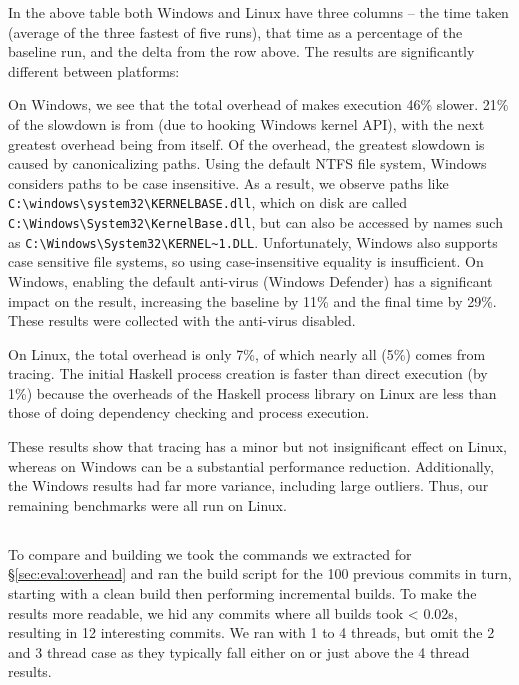 In the above table both Windows and Linux have three columns -- the time taken (average of the three fastest of five runs), that time as a percentage of the baseline \Make run, and the delta from the row above. The results are significantly different between platforms:

On Windows, we see that the total overhead of \Rattle makes execution 46\% slower. 21\% of the slowdown is from \Fsatrace (due to hooking Windows kernel API), with the next greatest overhead being from \Rattle itself. Of the \Rattle overhead, the greatest slowdown is caused by canonicalizing paths. Using the default NTFS file system, Windows considers paths to be case insensitive. As a result, we observe paths like \verb"C:\windows\system32\KERNELBASE.dll", which on disk are called \verb"C:\Windows\System32\KernelBase.dll", but can also be accessed by names such as \verb"C:\Windows\System32\KERNEL~1.DLL". Unfortunately, Windows also supports case sensitive file systems, so  using case-insensitive equality is insufficient.
%
On Windows, enabling the default anti-virus (Windows Defender) has a significant impact on the result, increasing the \Make baseline by 11\% and the final time by 29\%. These results were collected with the anti-virus disabled.

On Linux, the total overhead is only 7\%, of which nearly all (5\%) comes from tracing. The initial Haskell process creation is faster than direct \Make execution (by 1\%) because the overheads of the Haskell process library on Linux are less than those of \Make doing dependency checking and process execution.


These results show that tracing has a minor but not insignificant effect on Linux, whereas on Windows can be a substantial performance reduction. Additionally, the Windows results had far more variance, including large outliers. Thus, our remaining benchmarks were all run on Linux.

\subsection{\Fsatrace}
\label{sec:eval:fsatrace}

To compare \Make and \Rattle building \Fsatrace we took the commands we extracted for \S\ref{sec:eval:overhead} and ran the build script for the 100 previous commits in turn, starting with a clean build then performing incremental builds. To make the results more readable, we hid any commits where all builds took < 0.02s, resulting in 12 interesting commits. We ran with 1 to 4 threads, but omit the 2 and 3 thread case as they typically fall either on or just above the 4 thread results.

